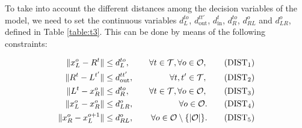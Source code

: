 \documentclass{itor}
\theoremstyle{definition}
\theoremstyle{remark}
\begin{document}
\noindent
To take into account the different distances among the decision variables of the model, we need to set the continuous variables $d_L^{to}$, $d_{\text{out}}^{tt'}$, $d_{\text{in}}^t$, $d_R^{to}$, $d_{RL}^o$ and $d_{LR}^o$, defined in Table \ref{table:t3}. This can be done by means of the following constraints:
 

\begin{align*}
\|x_L^o- R^t\| & \leq  d_L^{to},  &\quad \forall t\in\mathcal T, \forall o\in \mathcal O,\tag{DIST$_{1}$} \label{eq:d1}\\
\|R^{t}- L^{t'}\| & \leq  d_{\text{out}}^{tt'}, &\quad \forall t, t'\in\mathcal T, \tag{DIST$_{2}$} \label{eq:d2}\\
\|L^{t}- x_R^o\| & \leq  d_R^{to}, &\quad \forall t\in\mathcal T,\forall o\in \mathcal O, \tag{DIST$_{3}$} \label{eq:d3}\\
\|x_L^o- x_R^o\| & \leq  d_{LR}^o, & \quad \forall o\in \mathcal O. \tag{DIST$_{4}$} \label{eq:d4}\\
\|x_R^o- x_L^{o+1}\| & \leq  d_{RL}^o, & \quad \forall o\in \mathcal O\setminus\{|\mathcal O|\}. \tag{DIST$_{5}$} \label{eq:d6}\\
\end{align*}
\end{document}
